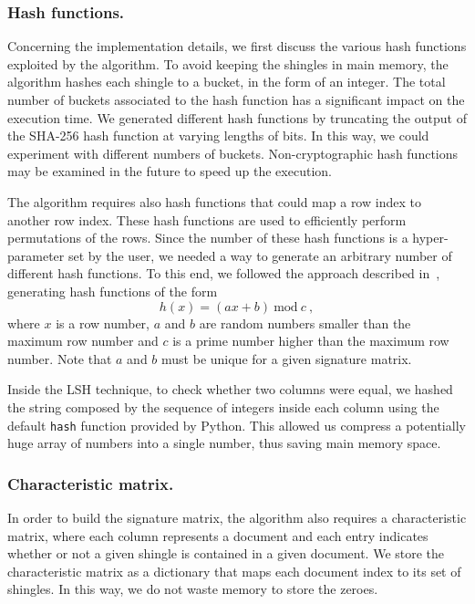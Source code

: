 \documentclass[runningheads]{llncs}
\begin{document}
\subsubsection{Hash functions.} Concerning the implementation details, we first discuss the various hash functions exploited by the algorithm. To avoid keeping the shingles in main memory, the algorithm hashes each shingle to a bucket, in the form of an integer. The total number of buckets associated to the hash function has a significant impact on the execution time. We generated different hash functions by truncating the output of the SHA-256 hash function at varying lengths of bits. In this way, we could experiment with different numbers of buckets. Non-cryptographic hash functions may be examined in the future to speed up the execution. 

The algorithm requires also hash functions that could map a row index to another row index. These hash functions are used to efficiently perform permutations of the rows. Since the number of these hash functions is a hyper-parameter set by the user, we needed a way to generate an arbitrary number of different hash functions. To this end, we followed the approach described in~\cite{liu_2015}, generating hash functions of the form
\[
  h(x) = (ax + b)~\text{mod}~c~,  
\]
where $x$ is a row number, $a$ and $b$ are random numbers smaller than the maximum row number and $c$ is a prime number higher than the maximum row number. Note that $a$ and $b$ must be unique for a given signature matrix.

Inside the LSH technique, to check whether two columns were equal, we hashed the string composed by the sequence of integers inside each column using the default \texttt{hash} function provided by Python. This allowed us compress a potentially huge array of numbers into a single number, thus saving main memory space. 

\subsubsection{Characteristic matrix.} In order to build the signature matrix, the algorithm also requires a characteristic matrix, where each column represents a document and each entry indicates whether or not a given shingle is contained in a given document. We store the characteristic matrix as a dictionary that maps each document index to its set of shingles. In this way, we do not waste memory to store the zeroes.
\end{document}

